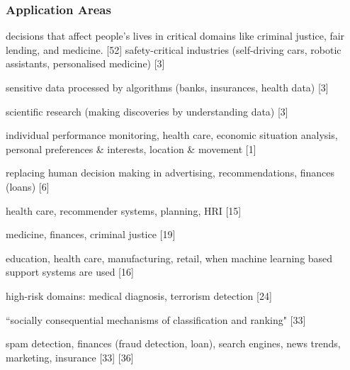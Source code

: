 \subsubsection{Application Areas}
decisions that affect people’s lives in critical domains like criminal
justice, fair lending, and medicine. [52]\newline
safety-critical industries (self-driving cars, robotic assistants, personalised medicine) [3]\newline

sensitive data processed by algorithms (banks, insurances, health data) [3]\newline

scientific research (making discoveries by understanding data) [3]\newline

individual performance monitoring, health care, economic situation analysis, personal preferences \& interests, location \& movement [1]\newline

replacing human decision making in advertising, recommendations, finances (loans) [6] \newline

health care, recommender systems, planning, HRI [15]\newline

medicine, finances, criminal justice [19] \newline

education, health care, manufacturing, retail, when machine learning based support systems are used [16] \newline

high-risk domains: medical diagnosis, terrorism detection [24] \newline

``socially consequential mechanisms of classification and ranking" [33] \newline

spam detection, finances (fraud detection, loan), search engines, news trends, marketing, insurance [33] [36] \newline

